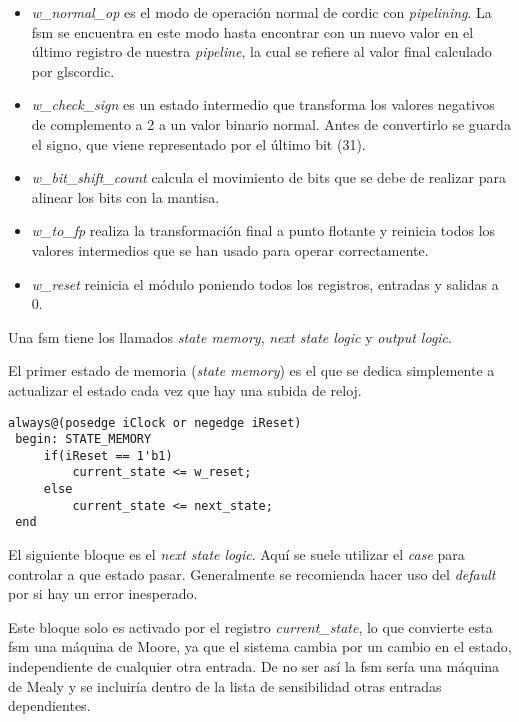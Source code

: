 \begin{itemize}
	\item \textit{w\_normal\_op} es el modo de operación normal de \gls{cordic} con \textit{pipelining}. La \gls{fsm} se encuentra en este modo hasta encontrar con un nuevo valor en el último registro de nuestra \textit{pipeline}, la cual se refiere al valor final calculado por gls{cordic}.
	
	\item \textit{w\_check\_sign} es un estado intermedio que transforma los valores negativos de complemento a 2 a un valor binario normal. Antes de convertirlo se guarda el signo, que viene representado por el último bit (31).
	
	\item \textit{w\_bit\_shift\_count} calcula el movimiento de bits que se debe de realizar para alinear los bits con la mantisa.
	
	\item \textit{w\_to\_fp} realiza la transformación final a punto flotante y reinicia todos los valores intermedios que se han usado para operar correctamente.
	
	\item \textit{w\_reset} reinicia el módulo poniendo todos los registros, entradas y salidas a 0.
	
\end{itemize}

Una \gls{fsm} tiene los llamados \textit{state memory}, \textit{next state logic} y \textit{output logic}.

El primer estado de memoria (\textit{state memory}) es el que se dedica simplemente a actualizar el estado cada vez que hay una subida de reloj.

\begin{lstlisting}[caption={\textit{state memory} de \gls{cordic}}]
always@(posedge iClock or negedge iReset)
 begin: STATE_MEMORY
     if(iReset == 1'b1)
         current_state <= w_reset;
     else
         current_state <= next_state;
 end
\end{lstlisting}

El siguiente bloque es el \textit{next state logic}. Aquí se suele utilizar el \textit{case} para controlar a que estado pasar. Generalmente se recomienda hacer uso del \textit{default} por si hay un error inesperado.

Este bloque solo es activado por el registro \textit{current\_state}, lo que convierte esta \gls{fsm} una máquina de Moore, ya que el sistema cambia por un cambio en el estado, independiente de cualquier otra entrada. De no ser así la \gls{fsm} sería una máquina de Mealy y se incluiría dentro de la lista de sensibilidad otras entradas dependientes.


